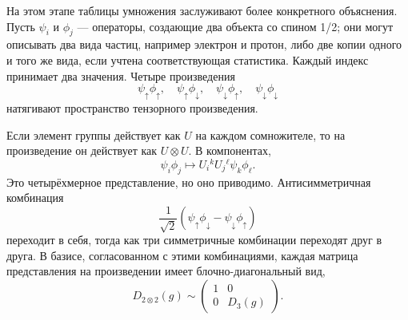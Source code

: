 На этом этапе таблицы умножения заслуживают более конкретного объяснения.
Пусть \(\psi_i\) и \(\phi_j\) — операторы, создающие два объекта со спином 1/2; они могут описывать два вида частиц, например электрон и протон, либо две копии одного и того же вида, если учтена соответствующая статистика.
Каждый индекс принимает два значения. Четыре произведения
\begin{equation}
\psi_\uparrow\phi_\uparrow,
\quad
\psi_\uparrow\phi_\downarrow,
\quad
\psi_\downarrow\phi_\uparrow,
\quad
\psi_\downarrow\phi_\downarrow
\end{equation}
натягивают пространство тензорного произведения.

Если элемент группы действует как \(U\) на каждом сомножителе, то на
произведение он действует как \(U\otimes U\). В компонентах,
\begin{equation}
\psi_i\phi_j
\longmapsto
U_i{}^kU_j{}^\ell\psi_k\phi_\ell.
\label{eq:l4-product-action}
\end{equation}
Это четырёхмерное представление, но оно приводимо. Антисимметричная комбинация
\begin{equation}
\frac{1}{\sqrt2}
(\psi_\uparrow\phi_\downarrow
-\psi_\downarrow\phi_\uparrow)
\end{equation}
переходит в себя, тогда как три симметричные комбинации переходят друг в друга. В базисе, согласованном с этими комбинациями, каждая матрица
представления на произведении имеет блочно-диагональный вид,
\begin{equation}
D_{2\otimes2}(g)
\sim
\begin{pmatrix}
1&0\\
0&D_3(g)
\end{pmatrix}.
\label{eq:l4-spin-block-diagonal}
\end{equation}

\begin{classroomqa}
\end{classroomqa}

